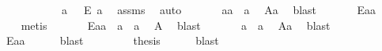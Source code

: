 \begin{isabellebody}
%
\isadelimproof
\ \ \ \ %
\endisadelimproof
%
\isatagproof
{}\isamarkupfalse%
\ {\isacharminus}\isanewline
\ \ \ \ \isamarkupfalse%
\ a\ \ {}{\isacharcolon}\ {\isachardoublequoteopen}\isactrlbold {\isasymnot}{\isacharparenleft}E\ a{\isacharparenright}{\isachardoublequoteclose}\ \isamarkupfalse%
\ assms\ \isamarkupfalse%
\ auto\isanewline
\ \ \ \ \isamarkupfalse%
\ {}{\isacharcolon}\ {\isachardoublequoteopen}{\isacharparenleft}{\isasymbox}a{\isacharparenright}\isactrlbold {\isasymcdot}a\ {\isasymcong}\ a{\isachardoublequoteclose}\ \isamarkupfalse%
\ A{}a\ \isamarkupfalse%
\ blast\isanewline
\ \ \ \ \isamarkupfalse%
\ {}{\isacharcolon}\ {\isachardoublequoteopen}\isactrlbold {\isasymnot}{\isacharparenleft}E{\isacharparenleft}{\isacharparenleft}{\isasymbox}a{\isacharparenright}\isactrlbold {\isasymcdot}a{\isacharparenright}{\isacharparenright}{\isachardoublequoteclose}\ \isamarkupfalse%
\ {}\ {}\ \isamarkupfalse%
\ metis\isanewline
\ \ \ \ \isamarkupfalse%
\ {}{\isacharcolon}\ {\isachardoublequoteopen}E{\isacharparenleft}{\isacharparenleft}{\isasymbox}a{\isacharparenright}\isactrlbold {\isasymcdot}a{\isacharparenright}\ \isactrlbold {\isasymleftrightarrow}\ {\isacharparenleft}{\isasymbox}a{\isacharparenright}{\isasymbox}\ {\isasymcong}\ {\isasymbox}a{\isachardoublequoteclose}\ \isamarkupfalse%
\ A{}\ \isamarkupfalse%
\ blast\isanewline
\ \ \ \ \isamarkupfalse%
\ {}{\isacharcolon}\ {\isachardoublequoteopen}{\isacharparenleft}{\isasymbox}a{\isacharparenright}{\isasymbox}\ {\isasymcong}\ {\isasymbox}a{\isachardoublequoteclose}\ \isamarkupfalse%
\ A{}a\ \isamarkupfalse%
\ blast\ \isanewline
\ \ \ \ \isamarkupfalse%
\ {}{\isacharcolon}\ {\isachardoublequoteopen}E{\isacharparenleft}{\isacharparenleft}{\isasymbox}a{\isacharparenright}\isactrlbold {\isasymcdot}a{\isacharparenright}{\isachardoublequoteclose}\ \isamarkupfalse%
\ {}\ {}\ \isamarkupfalse%
\ blast\ \isanewline
\ \ \ \ \isamarkupfalse%
\ \isamarkupfalse%
\ {\isacharquery}thesis\ \isamarkupfalse%
\ {}\ {}\ \isamarkupfalse%
\ blast\isanewline

\end{isabellebody}
